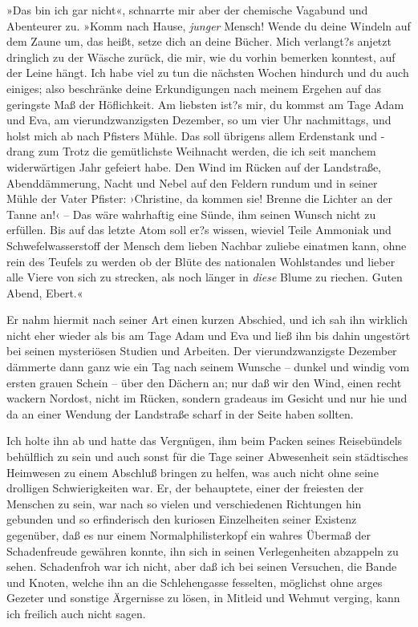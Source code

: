 »Das bin ich gar nicht«, schnarrte mir aber der chemische Vagabund
und Abenteurer zu. »Komm nach Hause, \emph{junger} Mensch! Wende du
deine Windeln auf dem Zaune um, das heißt, setze dich an deine
Bücher. Mich verlangt?s anjetzt dringlich zu der Wäsche zurück, die
mir, wie du vorhin bemerken konntest, auf der Leine hängt. Ich habe
viel zu tun die nächsten Wochen hindurch und du auch einiges; also
beschränke deine Erkundigungen nach meinem Ergehen auf das
geringste Maß der Höflichkeit. Am liebsten ist?s mir, du kommst am
Tage Adam und Eva, am vierundzwanzigsten Dezember, so um vier Uhr
nachmittags, und holst mich ab nach Pfisters Mühle. Das soll
übrigens allem Erdenstank und -drang zum Trotz die gemütlichste
Weihnacht werden, die ich seit manchem widerwärtigen Jahr gefeiert
habe. Den Wind im Rücken auf der Landstraße, Abenddämmerung, Nacht
und Nebel auf den Feldern rundum und in seiner Mühle der Vater
Pfister: ›Christine, da kommen sie! Brenne die Lichter an der Tanne
an!‹ – Das wäre wahrhaftig eine Sünde, ihm seinen Wunsch nicht zu
erfüllen. Bis auf das letzte Atom soll er?s wissen, wieviel Teile
Ammoniak und Schwefelwasserstoff der Mensch dem lieben Nachbar
zuliebe einatmen kann, ohne rein des Teufels zu werden ob der Blüte
des nationalen Wohlstandes und lieber alle Viere von sich zu
strecken, als noch länger in \emph{diese} Blume zu riechen. Guten
Abend, Ebert.«

Er nahm hiermit nach seiner Art einen kurzen Abschied, und ich sah
ihn wirklich nicht eher wieder als bis am Tage Adam und Eva und
ließ ihn bis dahin ungestört bei seinen mysteriösen Studien und
Arbeiten. Der vierundzwanzigste Dezember dämmerte dann ganz wie ein
Tag nach seinem Wunsche – dunkel und windig vom ersten grauen
Schein – über den Dächern an; nur daß wir den Wind, einen recht
wackern Nordost, nicht im Rücken, sondern gradeaus im Gesicht und
nur hie und da an einer Wendung der Landstraße scharf in der Seite
haben sollten.

Ich holte ihn ab und hatte das Vergnügen, ihm beim Packen seines
Reisebündels behülflich zu sein und auch sonst für die Tage seiner
Abwesenheit sein städtisches Heimwesen zu einem Abschluß bringen zu
helfen, was auch nicht ohne seine drolligen Schwierigkeiten war.
Er, der behauptete, einer der freiesten der Menschen zu sein, war
nach so vielen und verschiedenen Richtungen hin gebunden und so
erfinderisch den kuriosen Einzelheiten seiner Existenz gegenüber,
daß es nur einem Normalphilisterkopf ein wahres Übermaß der
Schadenfreude gewähren konnte, ihn sich in seinen Verlegenheiten
abzappeln zu sehen. Schadenfroh war ich nicht, aber daß ich bei
seinen Versuchen, die Bande und Knoten, welche ihn an die
Schlehengasse fesselten, möglichst ohne arges Gezeter und sonstige
Ärgernisse zu lösen, in Mitleid und Wehmut verging, kann ich
freilich auch nicht sagen.


